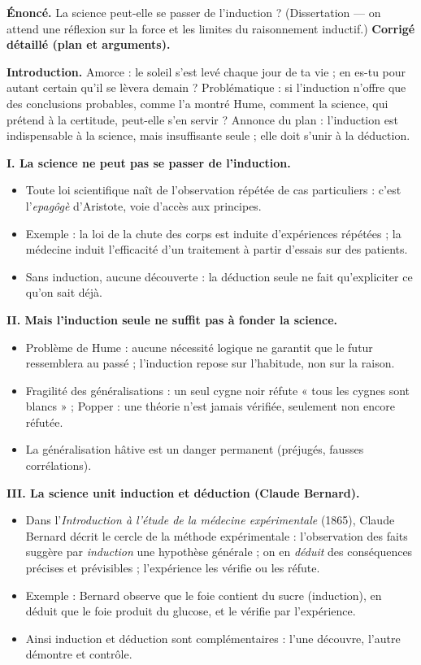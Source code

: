 \documentclass[11pt]{article}
\begin{document}
\begin{exoresolu}
\textbf{Énoncé.} La science peut-elle se passer de l'induction ? (Dissertation — on attend une réflexion sur la force et les limites du raisonnement inductif.)
\tcblower
\textbf{Corrigé détaillé (plan et arguments).}

\textbf{Introduction.} Amorce : le soleil s'est levé chaque jour de ta vie ; en es-tu pour autant certain qu'il se lèvera demain ? Problématique : si l'induction n'offre que des conclusions probables, comme l'a montré Hume, comment la science, qui prétend à la certitude, peut-elle s'en servir ? Annonce du plan : l'induction est indispensable à la science, mais insuffisante seule ; elle doit s'unir à la déduction.

\textbf{I. La science ne peut pas se passer de l'induction.}
\begin{itemize}
\item Toute loi scientifique naît de l'observation répétée de cas particuliers : c'est l'\emph{epagôgè} d'Aristote, voie d'accès aux principes.
\item Exemple : la loi de la chute des corps est induite d'expériences répétées ; la médecine induit l'efficacité d'un traitement à partir d'essais sur des patients.
\item Sans induction, aucune découverte : la déduction seule ne fait qu'expliciter ce qu'on sait déjà.
\end{itemize}

\textbf{II. Mais l'induction seule ne suffit pas à fonder la science.}
\begin{itemize}
\item Problème de Hume : aucune nécessité logique ne garantit que le futur ressemblera au passé ; l'induction repose sur l'habitude, non sur la raison.
\item Fragilité des généralisations : un seul cygne noir réfute « tous les cygnes sont blancs » ; Popper : une théorie n'est jamais vérifiée, seulement non encore réfutée.
\item La généralisation hâtive est un danger permanent (préjugés, fausses corrélations).
\end{itemize}

\textbf{III. La science unit induction et déduction (Claude Bernard).}
\begin{itemize}
\item Dans l'\emph{Introduction à l'étude de la médecine expérimentale} (1865), Claude Bernard décrit le cercle de la méthode expérimentale : l'observation des faits suggère par \emph{induction} une hypothèse générale ; on en \emph{déduit} des conséquences précises et prévisibles ; l'expérience les vérifie ou les réfute.
\item Exemple : Bernard observe que le foie contient du sucre (induction), en déduit que le foie produit du glucose, et le vérifie par l'expérience.
\item Ainsi induction et déduction sont complémentaires : l'une découvre, l'autre démontre et contrôle.
\end{itemize}


\end{exoresolu}
\end{document}
